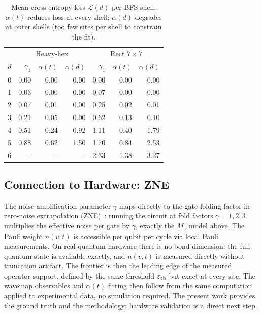 \documentclass[letterpaper]{article}
\begin{document}
\begin{table}[htb]
\centering
\setlength{\tabcolsep}{3pt}
\scriptsize
\begin{tabular}{r|rrr|rrr}
\toprule
 & \multicolumn{3}{c|}{Heavy-hex} & \multicolumn{3}{c}{Rect $7\times7$} \\
$d$ & $\gamma_1$ & $\alpha(t)$ & $\alpha(d)$ & $\gamma_1$ & $\alpha(t)$ & $\alpha(d)$ \\
\midrule
0 & 0.00 & 0.00 & 0.00 & 0.00 & 0.00 & 0.00 \\
1 &    0.03 & 0.00 &    0.00 &    0.07 & 0.00 &    0.00 \\
2 &    0.07 & 0.01 &    0.00 &    0.25 & 0.02 &    0.01 \\
3 &    0.21 & 0.05 &    0.00 &    0.62 & 0.13 &    0.10 \\
4 &    0.51 & 0.24 &    0.92 &    1.11 & 0.40 &    1.79 \\
5 &    0.88 & 0.62 &    1.50 &    1.70 & 0.84 &    2.53 \\
6 &     --  &  --  &    --   &    2.33 & 1.38 &    3.27 \\
\bottomrule
\end{tabular}
\caption{Mean cross-entropy loss $\mathcal{L}(d)$ per BFS shell.
$\alpha(t)$ reduces loss at every shell; $\alpha(d)$ degrades at
outer shells (too few sites per shell to constrain the fit).}
\label{tab:ld}
\end{table}

\subsection{Connection to Hardware: ZNE}

The noise amplification parameter $\gamma$ maps directly to the
gate-folding factor in zero-noise extrapolation
(ZNE)~\cite{giurgica2020digital}: running the circuit at fold factors
$\gamma=1,2,3$ multiplies the effective noise per gate by $\gamma$,
exactly the $M_\gamma$ model above.
The Pauli weight $n(v,t)$ is accessible per qubit per cycle via local
Pauli measurements.
On real quantum hardware there is no bond dimension: the full quantum
state is available exactly, and $n(v,t)$ is measured directly without
truncation artifact. The frontier is then the leading edge of the
measured operator support, defined by the same threshold
$\varepsilon_{\rm th}$ but exact at every site.
The wavemap observables and $\alpha(t)$ fitting then follow from the
same computation applied to experimental data, no simulation required.
The present work provides the ground truth and the methodology;
hardware validation is a direct next step.
\end{document}
